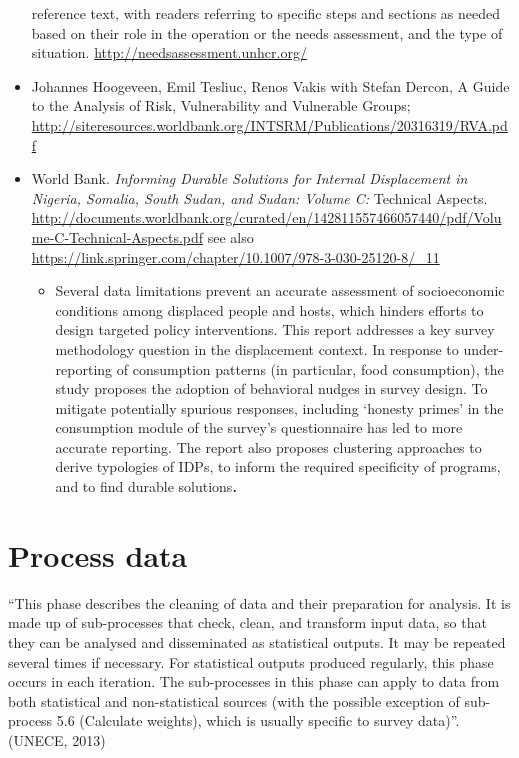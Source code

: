 \documentclass[
]{article}
\providecommand{\tightlist}{%
  \setlength{\itemsep}{0pt}\setlength{\parskip}{0pt}}
\begin{document}
\begin{itemize}
  reference text, with readers referring to specific steps and
  sections as needed based on their role in the operation or the needs
  assessment, and the type of situation.
  \url{http://needsassessment.unhcr.org/}
\item
  Johannes Hoogeveen, Emil Tesliuc, Renos Vakis with Stefan Dercon, A
  Guide to the Analysis of Risk, Vulnerability and Vulnerable Groups;
  \url{http://siteresources.worldbank.org/INTSRM/Publications/20316319/RVA.pdf}
\item
  World Bank. \emph{Informing Durable Solutions for Internal Displacement
  in Nigeria, Somalia, South Sudan, and Sudan: Volume C:} Technical
  Aspects.
  \url{http://documents.worldbank.org/curated/en/142811557466057440/pdf/Volume-C-Technical-Aspects.pdf}
  see also
  \url{https://link.springer.com/chapter/10.1007/978-3-030-25120-8/_11}

  \begin{itemize}
  \tightlist
  \item
    Several data limitations prevent an accurate assessment of
    socioeconomic conditions among displaced people and hosts, which
    hinders efforts to design targeted policy interventions. This
    report addresses a key survey methodology question in the
    displacement context. In response to under- reporting of
    consumption patterns (in particular, food consumption), the
    study proposes the adoption of behavioral nudges in survey
    design. To mitigate potentially spurious responses, including
    `honesty primes' in the consumption module of the survey's
    questionnaire has led to more accurate reporting. The report
    also proposes clustering approaches to derive typologies of
    IDPs, to inform the required specificity of programs, and to
    find durable solutions\textbf{. }
  \end{itemize}
\end{itemize}

\hypertarget{process-data}{%
\section{Process data}\label{process-data}}

``This phase describes the cleaning of data and their preparation for
analysis. It is made up of sub-processes that check, clean, and
transform input data, so that they can be analysed and disseminated as
statistical outputs. It may be repeated several times if necessary. For
statistical outputs produced regularly, this phase occurs in each
iteration. The sub-processes in this phase can apply to data from both
statistical and non-statistical sources (with the possible exception of
sub-process 5.6 (Calculate weights), which is usually specific to survey
data)''. (UNECE, 2013)
\end{document}
